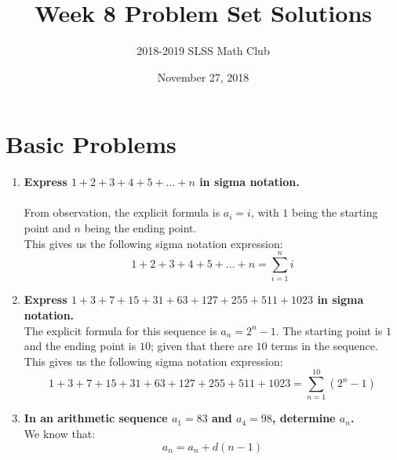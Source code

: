 \documentclass[12pt]{article}
\title{Week 8 Problem Set Solutions\vspace{-3mm}}
\author{2018-2019 SLSS Math Club\vspace{-5mm}}
\date{November 27, 2018\vspace{-5mm}}
\begin{document}
\maketitle

\newcommand{\bspace}{\\ \\ \\ \\ \\ \\ \\} 
\section*{Basic Problems}
\begin{enumerate}
    \item \textbf{Express $1 + 2 + 3 + 4 + 5 + \dots + n$ in sigma notation.} \\ \\
    From observation, the explicit formula is $a_i = i$, with $1$ being the starting point and $n$ being the ending point. \\
    
    This gives us the following sigma notation expression:
    \begin{equation*}
        1 + 2 + 3 + 4 + 5 + \dots + n = \sum_{i = 1}^n i
    \end{equation*}
    
    \item \textbf{Express $1 + 3 + 7 + 15 + 31 + 63 + 127 + 255 + 511 + 1023$ in sigma notation.} \\
    
    The explicit formula for this sequence is $a_n = 2^n - 1$. The starting point is $1$ and the ending point is $10$; given that there are $10$ terms in the sequence. \\
    
    This gives us the following sigma notation expression:
    \begin{equation*}
        1 + 3 + 7 + 15 + 31 + 63 + 127 + 255 + 511 + 1023 = \sum_{n = 1}^{10} (2^n - 1)
    \end{equation*}
    
    \item \textbf{In an arithmetic sequence $a_1 = 83$ and $a_4 = 98$, determine $a_n$.} \\
    
    We know that:
    \begin{equation*}
        a_n = a_n + d(n - 1)        
    \end{equation*}
    

\end{enumerate}
\end{document}
